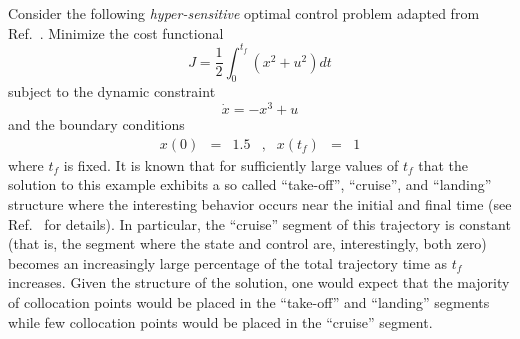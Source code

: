\documentclass[10pt]{article}
\begin{document}
Consider the following {\em hyper-sensitive} \cite{Rao3,Rao4,Rao5,Rao6}
optimal control problem adapted from Ref.~\cite{Rao4}.  Minimize the
cost functional 
\begin{equation}\label{hyperSensitiveCost}
J = \frac{1}{2}\int_{0}^{t_f} (x^2+u^2) dt
\end{equation}
subject to the dynamic constraint
\begin{equation}\label{hyperSensitiveDynamics}
  \dot{x} = -x^3+u
\end{equation}
and the boundary conditions
\begin{equation}\label{hyperSensitiveBCs}
  \begin{array}{lclclcl}
    x(0) & = & 1.5 & , & x(t_f) & = & 1
  \end{array}
\end{equation}
where $t_f$ is fixed.  It is known that for sufficiently large values
of $t_f$ that the solution to this example exhibits a so called
``take-off'', ``cruise'', and ``landing'' structure where the
interesting behavior occurs near the initial and final time (see
Ref.~\cite{Rao4} for details).  In particular, the ``cruise'' segment
of this trajectory is constant (that is, the segment where the state
and control are, interestingly, both zero) becomes an increasingly
large percentage of the total trajectory time as $t_f$ increases.
Given the structure of the solution, one would expect that the
majority of collocation points would be placed in the ``take-off'' and
``landing'' segments while few collocation points would be placed in
the ``cruise'' segment.
\end{document}
